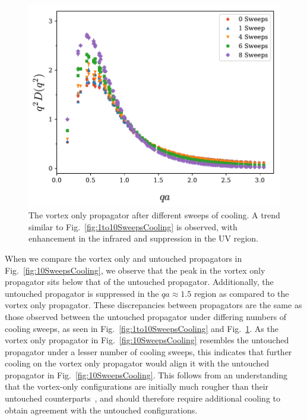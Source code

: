 %
\begin{figure}[H]
\centering
\includegraphics[width=0.95\linewidth]{./ScalarGluComp_q2_1to10sweepsVO.pdf}
\caption[The vortex only propagator after different sweeps of cooling.]{\label{fig:1to10VO}The vortex only propagator after different sweeps of cooling. A trend similar to Fig.~\ref{fig:1to10SweepsCooling} is observed, with enhancement in the infrared and suppression in the UV region.}
\end{figure}
%
When we compare the vortex only and untouched propagators in Fig.~\ref{fig:10SweepsCooling}, we observe that the peak in the vortex only propagator sits below that of the untouched propagator. Additionally, the untouched propagator is suppressed in the $qa\approx 1.5$ region as compared to the vortex only propagator. These discrepancies between propagators are the same as those observed between the untouched propagator under differing numbers of cooling sweeps, as seen in Fig.~\ref{fig:1to10SweepsCooling} and Fig.~\ref{fig:1to10VO}. As the vortex only propagator in Fig.~\ref{fig:10SweepsCooling} resembles the untouched propagator under a lesser number of cooling sweeps, this indicates that further cooling on the vortex only propagator would align it with the untouched propagator in Fig.~\ref{fig:10SweepsCooling}. This follows from an understanding that the vortex-only configurations are initially much rougher than their untouched counterparts~\cite{Trewartha:2015nna}, and should therefore require additional cooling to obtain agreement with the untouched configurations.\\
%
\clearpage
%
